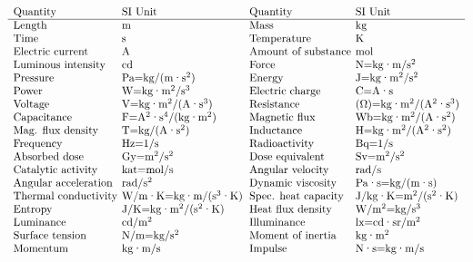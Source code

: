 { 
\[
\begin{array}{l@{\hskip 4pt}l@{\hskip 6pt}l@{\hskip 4pt}l}
\text{Quantity} & \text{SI Unit} & \text{Quantity} & \text{SI Unit} \\
\hline
\text{Length} & \text{m} & \text{Mass} & \text{kg} \\
\text{Time} & \text{s} & \text{Temperature} & \text{K} \\
\text{Electric current} & \text{A} & \text{Amount of substance} & \text{mol} \\
\text{Luminous intensity} & \text{cd} & \text{Force} & \text{N=kg·m/s$^2$} \\
\text{Pressure} & \text{Pa=kg/(m·s$^2$)} & \text{Energy} & \text{J=kg·m$^2$/s$^2$} \\
\text{Power} & \text{W=kg·m$^2$/s$^3$} & \text{Electric charge} & \text{C=A·s} \\
\text{Voltage} & \text{V=kg·m$^2$/(A·s$^3$)} & \text{Resistance} & \text{($\Omega$)=kg·m$^2$/(A$^2$·s$^3$)} \\
\text{Capacitance} & \text{F=A$^2$·s$^4$/(kg·m$^2$)} & \text{Magnetic flux} & \text{Wb=kg·m$^2$/(A·s$^2$)} \\
\text{Mag. flux density} & \text{T=kg/(A·s$^2$)} & \text{Inductance} & \text{H=kg·m$^2$/(A$^2$·s$^2$)} \\
\text{Frequency} & \text{Hz=1/s} & \text{Radioactivity} & \text{Bq=1/s} \\
\text{Absorbed dose} & \text{Gy=m$^2$/s$^2$} & \text{Dose equivalent} & \text{Sv=m$^2$/s$^2$} \\
\text{Catalytic activity} & \text{kat=mol/s} & \text{Angular velocity} & \text{rad/s} \\
\text{Angular acceleration} & \text{rad/s$^2$} & \text{Dynamic viscosity} & \text{Pa·s=kg/(m·s)} \\
\text{Thermal conductivity} & \text{W/m·K=kg·m/(s$^3$·K)} & \text{Spec. heat capacity} & \text{J/kg·K=m$^2$/(s$^2$·K)} \\
\text{Entropy} & \text{J/K=kg·m$^2$/(s$^2$·K)} & \text{Heat flux density} & \text{W/m$^2$=kg/s$^3$} \\
\text{Luminance} & \text{cd/m$^2$} & \text{Illuminance} & \text{lx=cd·sr/m$^2$} \\
\text{Surface tension} & \text{N/m=kg/s$^2$} & \text{Moment of inertia} & \text{kg·m$^2$} \\
\text{Momentum} & \text{kg·m/s} & \text{Impulse} & \text{N·s=kg·m/s} \\
\end{array}
\]
}